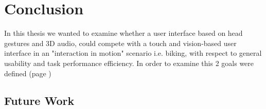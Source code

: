 \chapter{Conclusion}
In this thesis we wanted to examine whether a user interface based on head gestures and 3D audio, could compete with a touch and vision-based user interface in an "interaction in motion" scenario i.e. biking, with respect to general usability and task performance efficiency. In order to examine this 2 goals were defined (page \pageref{})


\section{Future Work}




